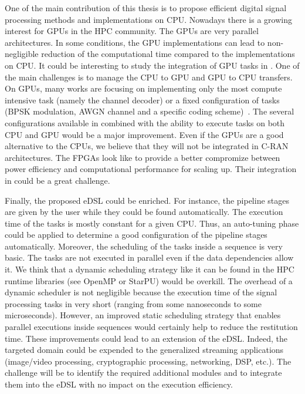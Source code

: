 One of the main contribution of this thesis is to propose efficient digital
signal processing methods and implementations on CPU. Nowadays there is a
growing interest for GPUs in the HPC community. The GPUs are very parallel
architectures. In some conditions, the GPU implementations can lead to
non-negligible reduction of the computational time compared to the
implementations on CPU. It could be interesting to study the integration of
GPU tasks in \AFFECT. One of the main challenges is to manage the CPU to GPU and
GPU to CPU transfers. On GPUs, many works are focusing on implementing only the
most compute intensive task (namely the channel decoder) or a fixed
configuration of tasks (BPSK modulation, AWGN channel and a specific coding
scheme)~\cite{Wu2011,Xianjun2013,LeGal2014a,Lai2016,Giard2016b,Keskin2017b}. The
several configurations available in \AFFECT combined with the ability to execute
tasks on both CPU and GPU would be a major improvement. Even if the GPUs are a
good alternative to the CPUs, we believe that they will not be integrated in
C-RAN architectures. The FPGAs look like to provide a better compromize
between power efficiency and computational performance for scaling up. Their
integration in \AFFECT could be a great challenge.

Finally, the proposed eDSL could be enriched. For instance, the pipeline stages
are given by the user while they could be found automatically. The execution
time of the tasks is mostly constant for a given CPU. Thus, an auto-tuning phase
could be applied to determine a good configuration of the pipeline stages
automatically. Moreover, the scheduling of the tasks inside a sequence is very
basic. The tasks are not executed in parallel even if the data dependencies
allow it. We think that a dynamic scheduling strategy like it can be found in
the HPC runtime libraries (see OpenMP or StarPU) would be overkill. The overhead
of a dynamic scheduler is not negligible because the execution time of the
signal processing tasks in very short (ranging from some nanoseconds to some
microseconds). However, an improved static scheduling strategy that enables
parallel executions inside sequences would certainly help to reduce the
restitution time. These improvements could lead to an extension of the \AFFECT
eDSL. Indeed, the targeted domain could be expended to the generalized streaming
applications (image/video processing, cryptographic processing, networking, DSP,
etc.). The challenge will be to identify the required additional modules and to
integrate them into the eDSL with no impact on the execution efficiency.
